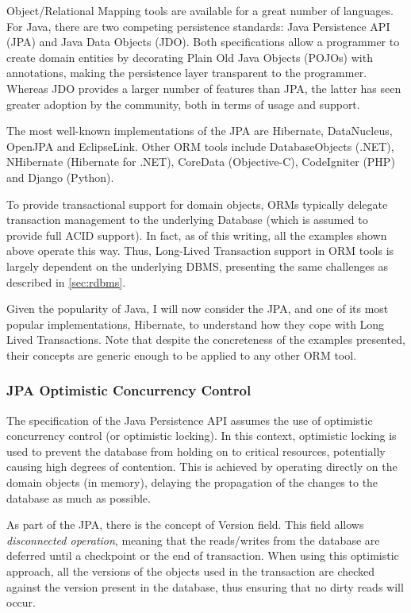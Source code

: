 \documentclass{llncs}
\begin{document}
Object/Relational Mapping tools are available for a great number of
languages. For Java, there are two competing persistence standards:
Java Persistence API (JPA) and Java Data Objects (JDO). Both
specifications allow a programmer to create domain entities by
decorating Plain Old Java Objects (POJOs) with annotations, making the
persistence layer transparent to the programmer. Whereas JDO provides
a larger number of features than JPA, the latter has seen greater
adoption by the community, both in terms of usage and support.

The most well-known implementations of the JPA are Hibernate,
DataNucleus, OpenJPA and EclipseLink. Other ORM tools include
DatabaseObjects (.NET), NHibernate (Hibernate for .NET), CoreData
(Objective-C), CodeIgniter (PHP) and Django (Python).

To provide transactional support for domain objects, ORMs typically
delegate transaction management to the underlying Database (which is
assumed to provide full ACID support). In fact, as of this writing,
all the examples shown above operate this way. Thus, Long-Lived
Transaction support in ORM tools is largely dependent on the
underlying DBMS, presenting the same challenges as described in
\ref{sec:rdbms}.

Given the popularity of Java, I will now consider the JPA, and one of
its most popular implementations, Hibernate, to understand how they
cope with Long Lived Transactions. Note that despite the concreteness
of the examples presented, their concepts are generic enough to be
applied to any other ORM tool.

\subsubsection{JPA Optimistic Concurrency Control}

The specification of the Java Persistence API assumes the use of
optimistic concurrency control (or optimistic locking). In this
context, optimistic locking is used to prevent the database from
holding on to critical resources, potentially causing high degrees of
contention.  This is achieved by operating directly on the domain
objects (in memory), delaying the propagation of the changes to the
database as much as possible.

As part of the JPA, there is the concept of Version field. This field
allows {\it disconnected operation}, meaning that the reads/writes
from the database are deferred until a checkpoint or the end of
transaction. When using this optimistic approach, all the versions of
the objects used in the transaction are checked against the version
present in the database, thus ensuring that no dirty reads will occur.
\end{document}
